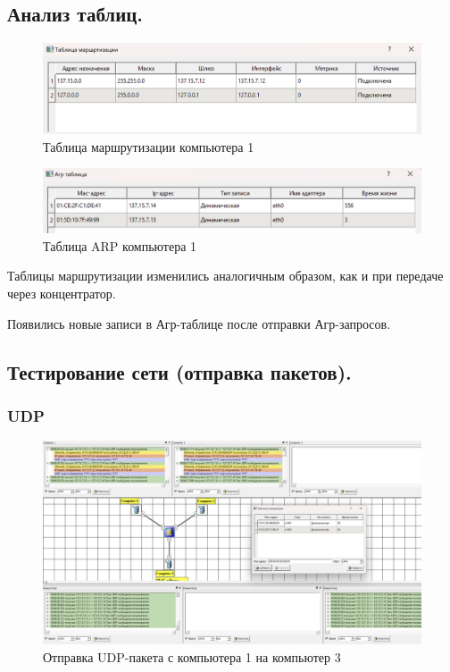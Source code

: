 \documentclass[12pt,onecolumn]{article}
\begin{document}
\subsection{Анализ таблиц.}
\begin{figure}[H]
  \centering
  \includegraphics[width=\textwidth]{image/part2/routing-table.png}
  \caption{Таблица маршрутизации компьютера 1}
\end{figure}
\begin{figure}[H]
  \centering
  \includegraphics[width=\textwidth]{image/part2/arp-table.png}
  \caption{Таблица ARP компьютера 1}
\end{figure}

Таблицы маршрутизации изменились аналогичным образом, как и при передаче через концентратор.

Появились новые записи в Агр-таблице после отправки Агр-запросов.

\subsection{Тестирование сети (отправка пакетов).}

\subsubsection{UDP}
\begin{figure}[H]
  \centering
  \includegraphics[width=\textwidth]{image/part2/udp.png}
  \caption{Отправка UDP-пакета с компьютера 1 на компьютер 3}
\end{figure}
\end{document}
